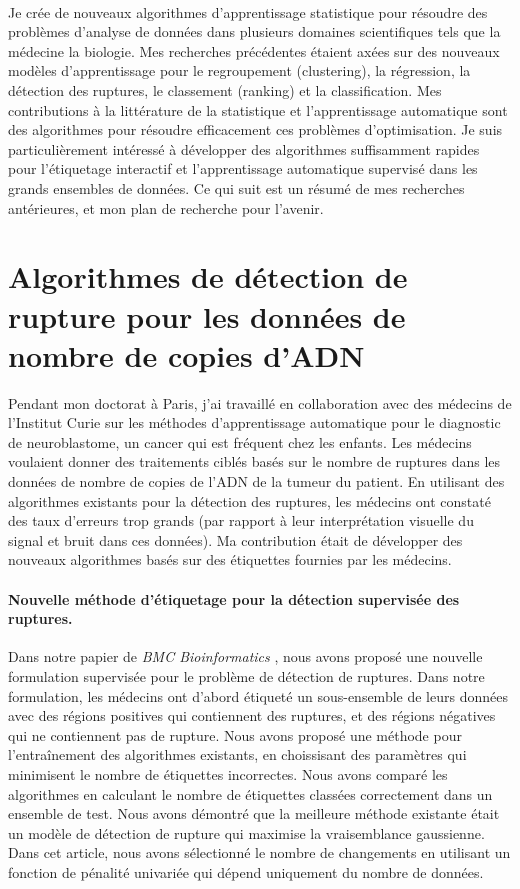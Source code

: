 \documentclass{article}
\begin{document}
\mbox{ }

Je crée de nouveaux algorithmes d'apprentissage statistique pour
résoudre des problèmes d'analyse de données dans plusieurs domaines
scientifiques tels que la médecine la biologie. Mes recherches
précédentes étaient axées sur des nouveaux modèles d'apprentissage
pour le regroupement (clustering), la régression, la détection des
ruptures, le classement (ranking) et la classification. Mes
contributions à la littérature de la statistique et l'apprentissage
automatique sont des algorithmes pour résoudre efficacement ces
problèmes d'optimisation. Je suis particulièrement intéressé à
développer des algorithmes suffisamment rapides pour l'étiquetage
interactif et l'apprentissage automatique supervisé dans les grands
ensembles de données. Ce qui suit est un résumé de mes recherches
antérieures, et mon plan de recherche pour l'avenir.

\section{Algorithmes de détection de rupture pour les données de nombre de copies d'ADN}

Pendant mon doctorat à Paris, j'ai travaillé en collaboration avec des
médecins de l'Institut Curie sur les méthodes d'apprentissage
automatique pour le diagnostic de neuroblastome, un cancer qui est
fréquent chez les enfants. Les médecins voulaient donner des
traitements ciblés basés sur le nombre de ruptures dans les données de
nombre de copies de l'ADN de la tumeur du patient. En utilisant des
algorithmes existants pour la détection des ruptures, les médecins ont
constaté des taux d'erreurs trop grands (par rapport à leur
interprétation visuelle du signal et bruit dans ces données). Ma
contribution était de développer des nouveaux algorithmes basés sur
des étiquettes fournies par les médecins.

\paragraph{Nouvelle méthode d'étiquetage pour la détection supervisée des ruptures.}

Dans notre papier de \emph{BMC Bioinformatics}
\citep{HOCKING-breakpoints}, nous avons proposé une nouvelle
formulation supervisée pour le problème de détection de ruptures. Dans
notre formulation, les médecins ont d'abord étiqueté un sous-ensemble
de leurs données avec des régions positives qui contiennent des
ruptures, et des régions négatives qui ne contiennent pas de rupture.
Nous avons proposé une méthode pour l'entraînement des algorithmes
existants, en choissisant des paramètres qui minimisent le nombre de
étiquettes incorrectes. Nous avons comparé les algorithmes en
calculant le nombre de étiquettes classées correctement dans un
ensemble de test. Nous avons démontré que la meilleure méthode
existante était un modèle de détection de rupture qui maximise la
vraisemblance gaussienne.  Dans cet article, nous avons sélectionné le
nombre de changements en utilisant un fonction de pénalité univariée
qui dépend uniquement du nombre de données.
\end{document}
